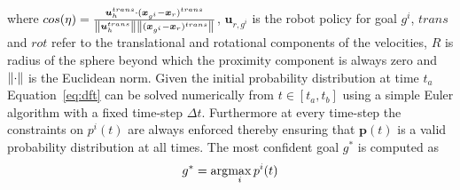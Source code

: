 where  $cos(\eta) = \frac{\boldsymbol{u}_h^{trans}\cdot(\boldsymbol{x}_{g^i} - \boldsymbol{x}_r)^{trans}}{\left\lVert\boldsymbol{u}_h^{trans}\right\rVert\left\lVert(\boldsymbol{x}_{g^i} - \boldsymbol{x}_r)^{trans}\right\rVert}$, $\boldsymbol{u}_{r,g^i}$ is the robot policy for goal $g^i$, $trans$ and $rot$ refer to the translational and rotational components of the velocities,  $R$ is radius of the sphere beyond which the proximity component is always zero and $\left\lVert\cdot\right\rVert$ is the Euclidean norm. 
Given the initial probability distribution at time $t_a$ Equation~\ref{eq:dft} can be solved numerically from $t \in [t_a, t_b]$ using a simple Euler algorithm with a fixed time-step $\Delta t$. Furthermore at every time-step the constraints on $p^i(t)$ are always enforced thereby ensuring that $\boldsymbol{p}(t)$ is a valid probability distribution at all times. The most confident goal $g^*$ is computed as 
\begin{equation}
g^* = \arg\!\max_i  p^i(t)
\end{equation}
	
